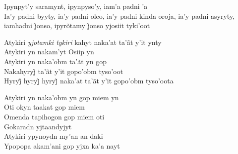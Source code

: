 \bigskip

\begin{linenumbers}
 
\noindent   Ipynpyt'y saramynt, ipynpyso'y, iam'a padni 'a\\
  Ia’y padni byyty, ia’y padni oleo, ia’y padni kinda oroja, ia’y padni asyryty, iamhadni j̃onso, ipyrõtamy j̃onso yjosiit tyki’oot
 
\end{linenumbers}

\bigskip

\begin{linenumbers}
 
\noindent   Atykiri \textit{yjotamki tykiri} kahyt naka'at ta'ãt y'it ynty\\
  Atykiri yn nakam'yt Osiip yn\\
  Atykiri yn naka'obm ta'ãt yn gop\\
  Nakahyryj̃ ta’ãt y’it gopo’obm tyso’oot\\
  Hyryj̃ hyryj̃ hyryj̃ naka’at ta’ãt y’it gopo’obm tyso’oota
 
\end{linenumbers}

\bigskip

\begin{linenumbers}
 
\noindent   Atykiri yn naka'obm yn gop miem yn\\
  Oti okyn taakat gop miem\\
  Omenda tapihogon gop miem oti\\
  Gokaradn yjtaandyjyt\\
  Atykiri ypynoydn my'an an daki\\
  Ypopopa akam'ani gop yjxa ka'a nayt
 
\end{linenumbers}

